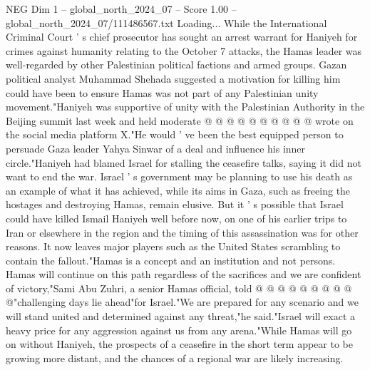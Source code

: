 \begin{textsample}{NEG Dim 1 – global\_north\_2024\_07 – Score 1.00 – global\_north\_2024\_07/111486567.txt}
Loading...
While the International Criminal Court ' s chief prosecutor has sought an arrest warrant for Haniyeh for crimes against humanity relating to the October 7 attacks, the Hamas leader was well-regarded by other Palestinian political factions and armed groups.
Gazan political analyst Muhammad Shehada suggested a motivation for killing him could have been to ensure Hamas was not part of any Palestinian unity movement."Haniyeh was supportive of unity with the Palestinian Authority in the Beijing summit last week and held moderate @ @ @ @ @ @ @ @ @ @ wrote on the social media platform X."He would ' ve been the best equipped person to persuade Gaza leader Yahya Sinwar of a deal and influence his inner circle."Haniyeh had blamed Israel for stalling the ceasefire talks, saying it did not want to end the war.
Israel ' s government may be planning to use his death as an example of what it has achieved, while its aims in Gaza, such as freeing the hostages and destroying Hamas, remain elusive.
But it ' s possible that Israel could have killed Ismail Haniyeh well before now, on one of his earlier trips to Iran or elsewhere in the region and the timing of this assassination was for other reasons.
It now leaves major players such as the United States scrambling to contain the fallout."Hamas is a concept and an institution and not persons.
Hamas will continue on this path regardless of the sacrifices and we are confident of victory,"Sami Abu Zuhri, a senior Hamas official, told @ @ @ @ @ @ @ @ @ @"challenging days lie ahead"for Israel."We are prepared for any scenario and we will stand united and determined against any threat,"he said."Israel will exact a heavy price for any aggression against us from any arena."While Hamas will go on without Haniyeh, the prospects of a ceasefire in the short term appear to be growing more distant, and the chances of a regional war are likely increasing.

\end{textsample}

